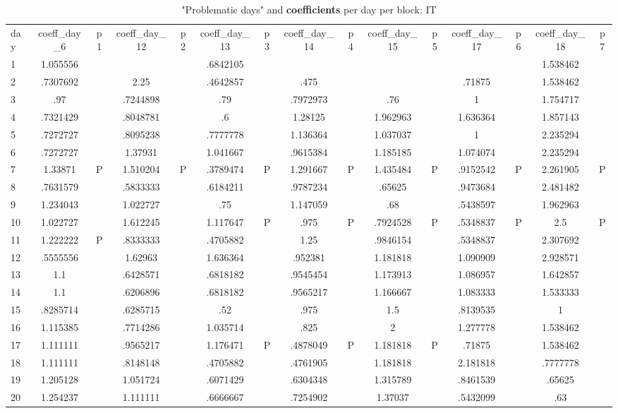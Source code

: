 \documentclass[a4paper,12pt]{article}
\begin{document}
\begin{landscape}
\begin{footnotesize}
\begin{center}
\begin{longtable}{l|cc|cc|cc|cc|cc|cc|cc|}
\caption{"Problematic days" and \textbf{coefficients} per day per block: IT\label{tab_it_4}}
\hline
day&coeff\_day\_6&p1&coeff\_day\_12&p2&coeff\_day\_13&p3&coeff\_day\_14&p4&coeff\_day\_15&p5&coeff\_day\_17&p6&coeff\_day\_18&p7 \\
1&1.055556&&&&.6842105&&&&&&&&1.538462& \\
2&.7307692&&2.25&&.4642857&&.475&&&&.71875&&1.538462& \\
3&.97&&.7244898&&.79&&.7972973&&.76&&1&&1.754717& \\
4&.7321429&&.8048781&&.6&&1.28125&&1.962963&&1.636364&&1.857143& \\
5&.7272727&&.8095238&&.7777778&&1.136364&&1.037037&&1&&2.235294& \\
6&.7272727&&1.37931&&1.041667&&.9615384&&1.185185&&1.074074&&2.235294& \\
7&1.33871&P&1.510204&P&.3789474&P&1.291667&P&1.435484&P&.9152542&P&2.261905&P \\
8&.7631579&&.5833333&&.6184211&&.9787234&&.65625&&.9473684&&2.481482& \\
9&1.234043&&1.022727&&.75&&1.147059&&.68&&.5438597&&1.962963& \\
10&1.022727&&1.612245&&1.117647&P&.975&P&.7924528&P&.5348837&P&2.5&P \\
11&1.222222&P&.8333333&&.4705882&&1.25&&.9846154&&.5348837&&2.307692& \\
12&.5555556&&1.62963&&1.636364&&.952381&&1.181818&&1.090909&&2.928571& \\
13&1.1&&.6428571&&.6818182&&.9545454&&1.173913&&1.086957&&1.642857& \\
14&1.1&&.6206896&&.6818182&&.9565217&&1.166667&&1.083333&&1.533333& \\
15&.8285714&&.6285715&&.52&&.975&&1.5&&.8139535&&1& \\
16&1.115385&&.7714286&&1.035714&&.825&&2&&1.277778&&1.538462& \\
17&1.111111&&.9565217&&1.176471&P&.4878049&P&1.181818&P&.71875&&1.538462& \\
18&1.111111&&.8148148&&.4705882&&.4761905&&1.181818&&2.181818&&.7777778& \\
19&1.205128&&1.051724&&.6071429&&.6304348&&1.315789&&.8461539&&.65625& \\
20&1.254237&&1.111111&&.6666667&&.7254902&&1.37037&&.5432099&&.63& \\

\end{longtable}
\end{center}
\end{footnotesize}
\end{landscape}
\end{document}

